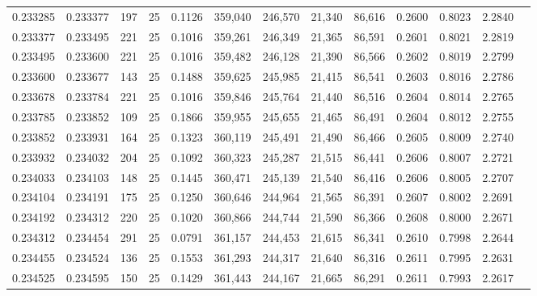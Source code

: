 \begin{tabular}{rrrrrrrrrrrrr}
0.233285 & 0.233377 &   197 &  25 &                                     0.1126 & 359,040 & 246,570 &  21,340 &  86,616 & 0.2600 & 0.8023 & 2.2840 \\
0.233377 & 0.233495 &   221 &  25 &                                     0.1016 & 359,261 & 246,349 &  21,365 &  86,591 & 0.2601 & 0.8021 & 2.2819 \\
0.233495 & 0.233600 &   221 &  25 &                                     0.1016 & 359,482 & 246,128 &  21,390 &  86,566 & 0.2602 & 0.8019 & 2.2799 \\
0.233600 & 0.233677 &   143 &  25 &                                     0.1488 & 359,625 & 245,985 &  21,415 &  86,541 & 0.2603 & 0.8016 & 2.2786 \\
0.233678 & 0.233784 &   221 &  25 &                                     0.1016 & 359,846 & 245,764 &  21,440 &  86,516 & 0.2604 & 0.8014 & 2.2765 \\
0.233785 & 0.233852 &   109 &  25 &                                     0.1866 & 359,955 & 245,655 &  21,465 &  86,491 & 0.2604 & 0.8012 & 2.2755 \\
0.233852 & 0.233931 &   164 &  25 &                                     0.1323 & 360,119 & 245,491 &  21,490 &  86,466 & 0.2605 & 0.8009 & 2.2740 \\
0.233932 & 0.234032 &   204 &  25 &                                     0.1092 & 360,323 & 245,287 &  21,515 &  86,441 & 0.2606 & 0.8007 & 2.2721 \\
0.234033 & 0.234103 &   148 &  25 &                                     0.1445 & 360,471 & 245,139 &  21,540 &  86,416 & 0.2606 & 0.8005 & 2.2707 \\
0.234104 & 0.234191 &   175 &  25 &                                     0.1250 & 360,646 & 244,964 &  21,565 &  86,391 & 0.2607 & 0.8002 & 2.2691 \\
0.234192 & 0.234312 &   220 &  25 &                                     0.1020 & 360,866 & 244,744 &  21,590 &  86,366 & 0.2608 & 0.8000 & 2.2671 \\
0.234312 & 0.234454 &   291 &  25 &                                     0.0791 & 361,157 & 244,453 &  21,615 &  86,341 & 0.2610 & 0.7998 & 2.2644 \\
0.234455 & 0.234524 &   136 &  25 &                                     0.1553 & 361,293 & 244,317 &  21,640 &  86,316 & 0.2611 & 0.7995 & 2.2631 \\
0.234525 & 0.234595 &   150 &  25 &                                     0.1429 & 361,443 & 244,167 &  21,665 &  86,291 & 0.2611 & 0.7993 & 2.2617 \\

\end{tabular}

